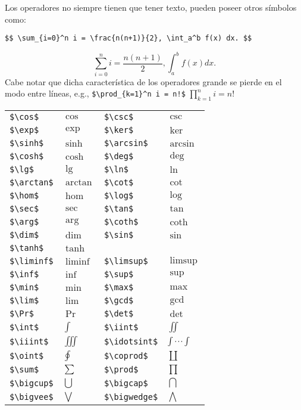 Los operadores no siempre tienen que tener texto, pueden poseer otros símbolos como:
\begin{lstlisting}[basicstyle=\footnotesize\ttfamily]
$$ \sum_{i=0}^n i = \frac{n(n+1)}{2}, \int_a^b f(x) dx. $$
\end{lstlisting}
$$ \sum_{i=0}^n i = \frac{n(n+1)}{2}, \int_a^b f(x) dx. $$
Cabe notar que dicha característica de los operadores grande se pierde en el modo entre líneas, e.g., \lstinline|$\prod_{k=1}^n i = n!$| $\prod_{k=1}^n i = n!$
\begin{longtable}{llll}
	\hline \hline
	\lstinline|$\cos$|    & $\cos$    & \lstinline|$\csc$|    & $\csc$ \\
	\lstinline|$\exp$|    & $\exp$    & \lstinline|$\ker$|    & $\ker$ \\
	\lstinline|$\sinh$|   & $\sinh$   & \lstinline|$\arcsin$| & $\arcsin$ \\
	\lstinline|$\cosh$|   & $\cosh$   & \lstinline|$\deg$|    & $\deg$ \\
	\lstinline|$\lg$|     & $\lg$     & \lstinline|$\ln$|     & $\ln$ \\
	\lstinline|$\arctan$| & $\arctan$ & \lstinline|$\cot$|    & $\cot$ \\
	\lstinline|$\hom$|    & $\hom$    & \lstinline|$\log$|    & $\log$ \\
	\lstinline|$\sec$|    & $\sec$    & \lstinline|$\tan$|    & $\tan$ \\
	\lstinline|$\arg$|    & $\arg$    & \lstinline|$\coth$|   & $\coth$ \\
	\lstinline|$\dim$|    & $\dim$    & \lstinline|$\sin$|    & $\sin$ \\
	\lstinline|$\tanh$|   & $\tanh$ \\
	\hline
	\lstinline|$\liminf$|   & $\liminf$   & \lstinline|$\limsup$|   & $\limsup$ \\
	\lstinline|$\inf$|      & $\inf$      & \lstinline|$\sup$|      & $\sup$ \\
	\lstinline|$\min$|      & $\min$      & \lstinline|$\max$|      & $\max$ \\
	\lstinline|$\lim$|      & $\lim$      & \lstinline|$\gcd$|      & $\gcd$ \\
	\lstinline|$\Pr$|       & $\Pr$       & \lstinline|$\det$|      & $\det$ \\
	\lstinline|$\int$|      & $\int$      & \lstinline|$\iint$|     & $\iint$ \\
	\lstinline|$\iiint$|    & $\iiint$    & \lstinline|$\idotsint$| & $\idotsint$ \\
	\lstinline|$\oint$|     & $\oint$     & \lstinline|$\coprod$|   & $\coprod$ \\
	\lstinline|$\sum$|      & $\sum$      & \lstinline|$\prod$|     & $\prod$ \\
	\lstinline|$\bigcup$|   & $\bigcup$   & \lstinline|$\bigcap$|   & $\bigcap$ \\
	\lstinline|$\bigvee$|   & $\bigvee$   & \lstinline|$\bigwedge$| & $\bigwedge$ \\
	\hline \hline
\end{longtable}

